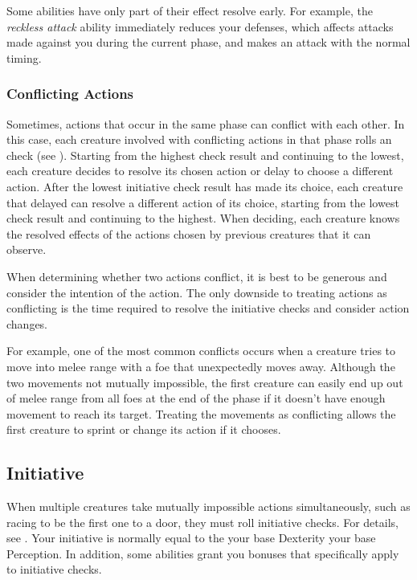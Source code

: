             Some abilities have only part of their effect resolve early.
            For example, the \textit{reckless attack} ability immediately reduces your defenses, which affects attacks made against you during the current phase, and makes an attack with the normal timing.

        \subsubsection{Conflicting Actions}\label{Conflicting Actions}

            Sometimes, actions that occur in the same phase can conflict with each other.
            In this case, each creature involved with conflicting actions in that phase rolls an  check (see ).
            Starting from the highest check result and continuing to the lowest, each creature decides to resolve its chosen action or delay to choose a different action.
            After the lowest initiative check result has made its choice, each creature that delayed can resolve a different action of its choice, starting from the lowest check result and continuing to the highest.
            When deciding, each creature knows the resolved effects of the actions chosen by previous creatures that it can observe.

            When determining whether two actions conflict, it is best to be generous and consider the intention of the action.
            The only downside to treating actions as conflicting is the time required to resolve the initiative checks and consider action changes.

            For example, one of the most common conflicts occurs when a creature tries to move into melee range with a foe that unexpectedly moves away.
            Although the two movements not mutually impossible, the first creature can easily end up out of melee range from all foes at the end of the phase if it doesn't have enough movement to reach its target.
            Treating the movements as conflicting allows the first creature to sprint or change its action if it chooses.

    \subsection{Initiative}\label{Initiative}
        When multiple creatures take mutually impossible actions simultaneously, such as racing to be the first one to a door, they must roll initiative checks.
        For details, see .
        Your initiative is normally equal to the your base Dexterity \add your base Perception.
        In addition, some abilities grant you bonuses that specifically apply to initiative checks.

